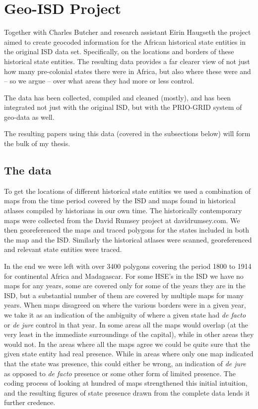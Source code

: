 \documentclass[12pt]{article}
\begin{document}
\section{Geo-ISD Project}

Together with Charles Butcher and research assistant Eirin Haugseth the project
aimed to create geocoded information for the African historical state entities
in the original ISD data set.  Specifically, on the locations and borders of
these historical state entities. The resulting data provides a far clearer view
of not just how many pre-colonial states there were in Africa, but also where
these were and -- so we argue -- over what areas they had more or less control.

The data has been collected, compiled and cleaned (mostly), and has been
integrated not just with the original ISD, but with the PRIO-GRID system of
geo-data as well.

The resulting papers using this data (covered in the subsections below) will
form the bulk of my thesis.

\subsection{The data}

To get the locations of different historical state entities we used a
combination of maps from the time period covered by the ISD and maps found in
historical atlases compiled by historians in our own time.  The historically
contemporary maps were collected from the David Rumsey project at
davidrumsey.com.  We then georeferenced the maps and traced polygons for the
states included in both the map and the ISD.  Similarly the historical atlases
were scanned, georeferenced and relevant state entities were traced.

In the end we were left with over 3400 polygons covering the period 1800 to 1914
for continental Africa and Madagascar. For some HSE's in the ISD we have no maps
for any years, some are covered only for some of the years they are in the ISD,
but a substantial number of them are covered by multiple maps for many years.
When maps disagreed on where the various borders were in a given year, we take
it as an indication of the ambiguity of where a given state had \emph{de facto}
or \emph{de jure} control in that year. In some areas all the maps would overlap
(at the very least in the immediate surroundings of the capital), while in other
areas they would not. In the areas where all the maps agree we could be quite
sure that the given state entity had real presence. While in areas where only
one map indicated that the state was presence, this could either be wrong, an
indication of \emph{de jure} as opposed to \emph{de facto} presence or some
other form of limited presence. The coding process of looking at hundred of maps
strengthened this initial intuition, and the resulting figures of state presence
drawn from the complete data lends it further credence. 
\end{document}
